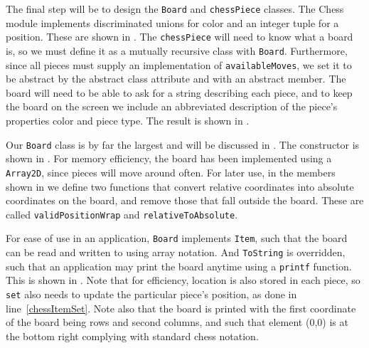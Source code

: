 \documentclass[fsharpNotes.tex]{subfiles}
\begin{document}
The final step will be to design the \lstinline{Board} and \lstinline{chessPiece} classes. The Chess module implements discriminated unions for color and an integer tuple for a position. These are shown in .
%
%
The \lstinline{chessPiece} will need to know what a board is, so we must define it as a mutually recursive class with \lstinline{Board}. Furthermore, since all pieces must supply an implementation of \lstinline{availableMoves}, we set it to be abstract by the abstract class attribute and with an abstract member. The board will need to be able to ask for a string describing each piece, and to keep the board on the screen we include an abbreviated description of the piece's properties color and piece type. The result is shown in .
%
%

Our \lstinline{Board} class is by far the largest and will be discussed in . The constructor is shown in .
%
%
For memory efficiency, the board has been implemented using a \lstinline{Array2D}, since pieces will move around often. For later use, in the members shown in  we define two functions that convert relative coordinates into absolute coordinates on the board, and remove those that fall outside the board. These are called \lstinline{validPositionWrap} and \lstinline{relativeToAbsolute}.

For ease of use in an application, \lstinline{Board} implements \lstinline{Item}, such that the board can be read and written to using array notation. And \lstinline{ToString} is overridden, such that an application may print the board anytime using a \lstinline{printf} function. This is shown in .
%
%
Note that for efficiency, location is also stored in each piece, so \lstinline{set} also needs to update the particular piece's position, as done in line~\ref{chessItemSet}. Note also that the board is printed with the first coordinate of the board being rows and second columns, and such that element (0,0) is at the bottom right complying with standard chess notation.
\clearpage%
\end{document}
